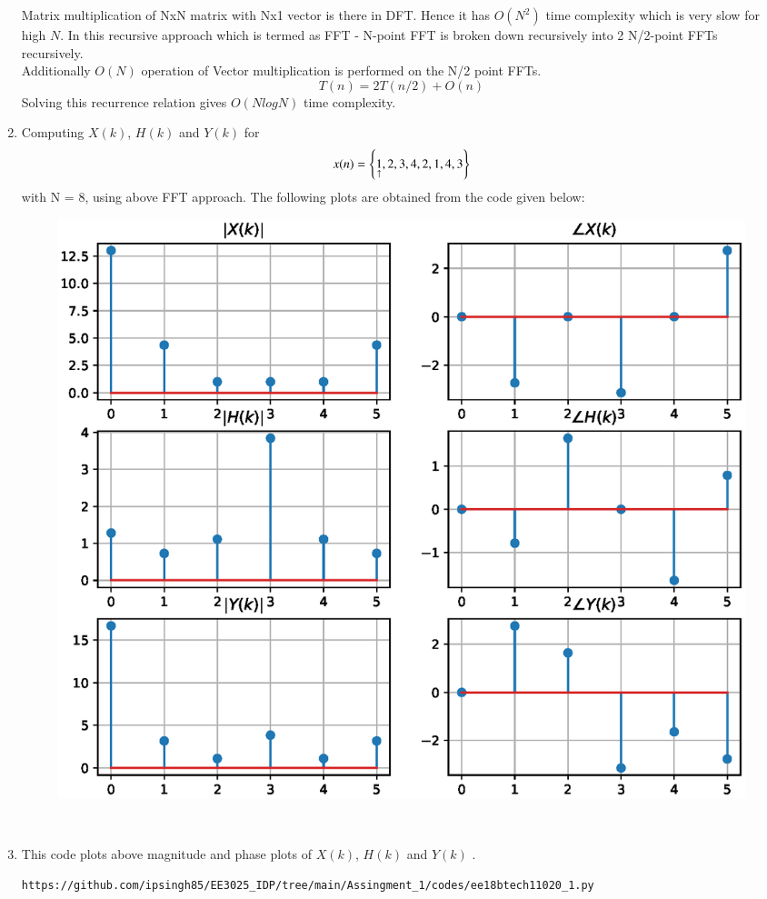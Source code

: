 \documentclass[journal,12pt,twocolumn]{IEEEtran}
\renewcommand\thesection{\arabic{section}}
\begin{document}
\begin{enumerate}[label=\thesection.\arabic*.,ref=\thesection.\theenumi]
Matrix multiplication of NxN matrix with Nx1 vector is there in DFT.
Hence it has $O(N^2)$ time complexity which is very slow for high $N$.
\newline
In this recursive approach which is termed as FFT - N-point FFT is broken down recursively into 2 N/2-point FFTs recursively.\\
Additionally $O(N)$ operation of Vector multiplication is performed on the N/2 point FFTs.
\begin{equation}
T(n) = 2T(n/2) + O(n)
\end{equation}
Solving this recurrence relation gives $O(NlogN)$ time complexity.
\item Computing $X(k)$, $H(k)$ and $Y(k)$ for 
\begin{align}
x(n) = \left\{\underset{\uparrow}{1},2,3,4,2,1,4,3\right\}
\end{align}
with N = 8, using above FFT approach.
The following plots are obtained from the code given below:
\begin{figure}[!ht]
	\includegraphics[width=1.15\columnwidth]{./figs/Figure_1.eps}
\end{figure}
\\
\item This code plots above magnitude and phase plots of $X(k)$, $H(k)$ and $Y(k)$ .
\begin{lstlisting}
https://github.com/ipsingh85/EE3025_IDP/tree/main/Assingment_1/codes/ee18btech11020_1.py
\end{lstlisting}





\end{enumerate}
\end{document}
